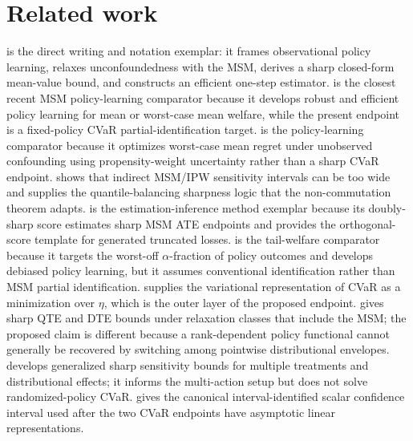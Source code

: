 \documentclass[11pt]{article}
\theoremstyle{definition}
\theoremstyle{plain}
\theoremstyle{remark}
\begin{document}
\section{Related work}
\citet{HessFrauenMelnychukFeuerriegel2025SharpOPE} is the direct writing and notation exemplar: it frames observational policy learning, relaxes unconfoundedness with the MSM, derives a sharp closed-form mean-value bound, and constructs an efficient one-step estimator.  \citet{JinXuZhengZhou2025RobustEfficientPolicy} is the closest recent MSM policy-learning comparator because it develops robust and efficient policy learning for mean or worst-case mean welfare, while the present endpoint is a fixed-policy CVaR partial-identification target.  \citet{KallusZhou2018ConfoundingRobustPolicy} is the policy-learning comparator because it optimizes worst-case mean regret under unobserved confounding using propensity-weight uncertainty rather than a sharp CVaR endpoint.  \citet{DornGuo2021QuantileBalancing} shows that indirect MSM/IPW sensitivity intervals can be too wide and supplies the quantile-balancing sharpness logic that the non-commutation theorem adapts.  \citet{DornGuoKallus2021DoublySharp} is the estimation-inference method exemplar because its doubly-sharp score estimates sharp MSM ATE endpoints and provides the orthogonal-score template for generated truncated losses.  \citet{FanQiXu2025AlphaExpectedWelfare} is the tail-welfare comparator because it targets the worst-off \(\alpha\)-fraction of policy outcomes and develops debiased policy learning, but it assumes conventional identification rather than MSM partial identification.  \citet{RockafellarUryasev2000CVaR} supplies the variational representation of CVaR as a minimization over \(\eta\), which is the outer layer of the proposed endpoint.  \citet{MastenPoirierRen2025RelaxingUnconfoundedness} gives sharp QTE and DTE bounds under relaxation classes that include the MSM; the proposed claim is different because a rank-dependent policy functional cannot generally be recovered by switching among pointwise distributional envelopes.  \citet{FrauenMelnychukFeuerriegel2023GeneralizedCSA} develops generalized sharp sensitivity bounds for multiple treatments and distributional effects; it informs the multi-action setup but does not solve randomized-policy CVaR.  \citet{ImbensManski2004PartialIDCI} gives the canonical interval-identified scalar confidence interval used after the two CVaR endpoints have asymptotic linear representations.
\end{document}
